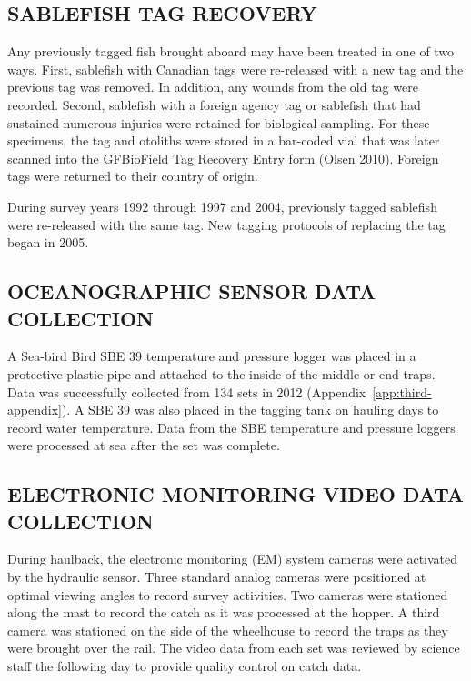 \documentclass[12pt]{article}\usepackage[]{graphicx}\usepackage[]{color}
\begin{document}
\hypertarget{sablefish-tag-recovery}{%
\subsection{SABLEFISH TAG RECOVERY}\label{sablefish-tag-recovery}}

Any previously tagged fish brought aboard may have been treated in one of two ways. First, sablefish with Canadian tags were re-released with a new tag and the previous tag was removed. In addition, any wounds from the old tag were recorded. Second, sablefish with a foreign agency tag or sablefish that had sustained numerous injuries were retained for biological sampling. For these specimens, the tag and otoliths were stored in a bar-coded vial that was later scanned into the GFBioField Tag Recovery Entry form (Olsen \protect\hyperlink{ref-Olsen2010}{2010}). Foreign tags were returned to their country of origin.

During survey years 1992 through 1997 and 2004, previously tagged sablefish were re-released with the same tag. New tagging protocols of replacing the tag began in 2005.

\hypertarget{oceanographic-sensor-data-collection}{%
\subsection{OCEANOGRAPHIC SENSOR DATA COLLECTION}\label{oceanographic-sensor-data-collection}}

A Sea-bird Bird SBE 39 temperature and pressure logger was placed in a protective plastic pipe and attached to the inside of the middle or end traps. Data was successfully collected from 134 sets in 2012 (Appendix~\ref{app:third-appendix}). A SBE 39 was also placed in the tagging tank on hauling days to record water temperature. Data from the SBE temperature and pressure loggers were processed at sea after the set was complete.

\hypertarget{electronic-monitoring-video-data-collection}{%
\subsection{ELECTRONIC MONITORING VIDEO DATA COLLECTION}\label{electronic-monitoring-video-data-collection}}

During haulback, the electronic monitoring (EM) system cameras were activated by the hydraulic sensor. Three standard analog cameras were positioned at optimal viewing angles to record survey activities. Two cameras were stationed along the mast to record the catch as it was processed at the hopper. A third camera was stationed on the side of the wheelhouse to record the traps as they were brought over the rail. The video data from each set was reviewed by science staff the following day to provide quality control on catch data.
\end{document}
